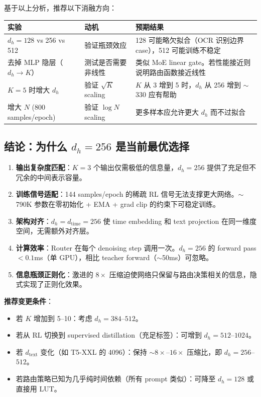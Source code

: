 \documentclass[11pt,a4paper]{article}
\begin{document}
基于以上分析，推荐以下消融方向：

\begin{center}
\begin{tabular}{l|p{4cm}|p{5.5cm}}
\toprule
\textbf{实验} & \textbf{动机} & \textbf{预期结果} \\
\midrule
$d_h = 128$ vs 256 vs 512 & 验证瓶颈效应 & 128 可能略欠拟合（OCR 识别边界 case），512 可能训练不稳定 \\
\midrule
去掉 MLP 隐层（$d_h \to K$） & 测试是否需要非线性 & 类似 MoE linear gate。若性能接近则说明路由函数接近线性 \\
\midrule
$K = 5$ 时增大 $d_h$ & 验证 $\sqrt{K}$ scaling & $K$ 从 3 增到 5 时，$d_h$ 从 256 增到 $\sim$330 应有帮助 \\
\midrule
增大 $N$ (800 samples/epoch) & 验证 $\log N$ scaling & 更多样本应允许更大 $d_h$ 而不过拟合 \\
\bottomrule
\end{tabular}
\end{center}

\subsection{结论：为什么 $d_h = 256$ 是当前最优选择}

\begin{tcolorbox}[colback=green!5, colframe=green!50, title=设计总结]
\begin{enumerate}
    \item \textbf{输出复杂度匹配}：$K = 3$ 个输出仅需极低的信息量，$d_h = 256$ 提供了充足但不冗余的中间表示容量。
    \item \textbf{训练信号适配}：144 samples/epoch 的稀疏 RL 信号无法支撑更大网络。$\sim$790K 参数在零初始化 + EMA + grad clip 的约束下可稳定训练。
    \item \textbf{架构对齐}：$d_h = d_{\text{time}} = 256$ 使 time embedding 和 text projection 在同一维度空间，无需额外对齐层。
    \item \textbf{计算效率}：Router 在每个 denoising step 调用一次。$d_h = 256$ 的 forward pass $< 0.1$ms（单 GPU），相比 teacher forward（$\sim$50ms）可忽略。
    \item \textbf{信息瓶颈正则化}：激进的 $8\times$ 压缩迫使网络只保留与路由决策相关的信息，隐式实现了正则化效果。
\end{enumerate}
\end{tcolorbox}

\textbf{推荐变更条件}：
\begin{itemize}
    \item 若 $K$ 增加到 5--10：考虑 $d_h = 384$--$512$。
    \item 若从 RL 切换到 supervised distillation（充足标签）：可增到 $d_h = 512$--$1024$。
    \item 若 $d_{\text{text}}$ 变化（如 T5-XXL 的 4096）：保持 $\sim 8\times$--$16\times$ 压缩比，即 $d_h = 256$--$512$。
    \item 若路由策略已知为几乎纯时间依赖（所有 prompt 类似）：可降至 $d_h = 128$ 或直接用 LUT。
\end{itemize}
\end{document}
